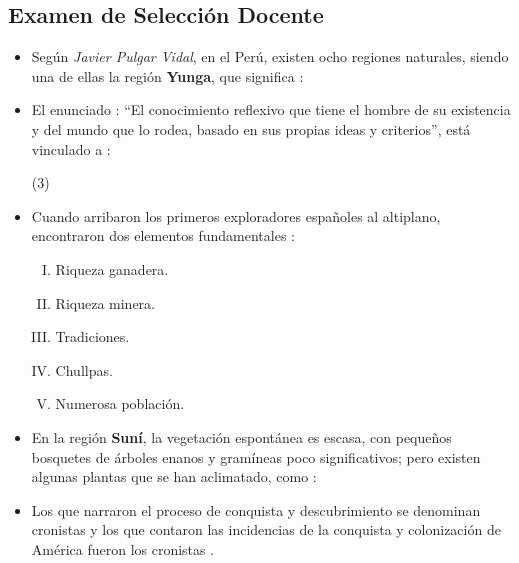\documentclass[10pt, twocolumn, landscape, a4paper]{article}
\begin{document}
\subsection*{Examen de Selección Docente}

\begin{itemize}
\item{Según \textit{Javier Pulgar Vidal}, en el Perú, existen ocho regiones naturales, siendo una de ellas la región \textbf{Yunga}, que significa :
\begin{tasks}
\end{tasks}}
\item{El enunciado : ``El conocimiento reflexivo que tiene el hombre de su existencia y del mundo que lo rodea, basado en sus propias ideas y criterios'', está vinculado a :
\begin{tasks}(3)
\end{tasks}}
\item{Cuando arribaron los primeros exploradores españoles al altiplano, encontraron dos elementos fundamentales :
\begin{enumerate}[I. ]
\item{Riqueza ganadera.}
\item{Riqueza minera.}
\item{Tradiciones.}
\item{Chullpas.}
\item{Numerosa población.}
\end{enumerate}
\begin{tasks}
\end{tasks}}
\item{En la región \textbf{Suní}, la vegetación espontánea es escasa, con pequeños bosquetes de árboles enanos y gramíneas poco significativos; pero existen algunas plantas que se han aclimatado, como :
\begin{tasks}
\end{tasks}}
\item{Los que narraron el proceso de conquista y descubrimiento se denominan cronistas \hspace{1cm} y los que contaron las incidencias de la conquista y colonización de América fueron los cronistas \hspace{1cm}.
}
\end{itemize}
\end{document}
